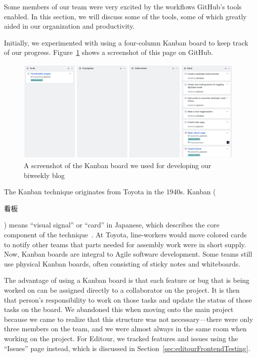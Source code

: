 \documentclass[a4paper, 10pt, american, titlepage]{article}
\begin{document}
Some members of our team were very excited by the workflows GitHub's tools
enabled. In this section, we will discuss some of the tools, some of which
greatly aided in our organization and productivity.

Initially, we experimented with using a four-column Kanban board to keep track
of our progress. Figure~\ref{fig:kanbanBoard} shows a screenshot of this page on
GitHub.

\begin{figure}[h]
	\centering
	\includegraphics[width=\textwidth]{kanban-board.png}
	\caption{A screenshot of the Kanban board we used for developing our
    biweekly blog}
	\label{fig:kanbanBoard}
\end{figure}

The Kanban technique originates from Toyota in the 1940s. Kanban
(\begin{CJK}{UTF8}{min}看板\end{CJK}) means ``visual signal'' or ``card'' in
Japanese, which describes the core component of the
technique~\autocite{terry2019}. At Toyota, line-workers would move colored cards
to notify other teams that parts needed for assembly work were in short supply.
Now, Kanban boards are integral to Agile software development. Some teams still
use physical Kanban boards, often consisting of sticky notes and whiteboards.

The advantage of using a Kanban board is that each feature or bug that
is being worked on can be assigned directly to a collaborator on the project. It
is then that person's responsibility to work on those tasks and update the
status of those tasks on the board. We abandoned this when moving onto the main
project because we came to realize that this structure was not necessary---there
were only three members on the team, and we were almost always in the same room
when working on the project. For Editour, we tracked features and issues using
the ``Issues'' page instead, which is discussed in
Section~\ref{sec:editourFrontendTesting}.
\end{document}
